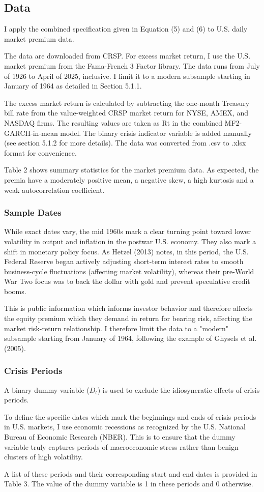 \documentclass[12pt]{article}
\begin{document}
\subsection{Data}
I apply the combined specification given in Equation (5) and (6) to U.S. daily market premium data.\par
The data are downloaded from CRSP. For excess market return, I use the U.S. market premium from the Fama-French 3 Factor library. The data runs from July of 1926 to April of 2025, inclusive. I limit it to a modern subsample starting in January of 1964 as detailed in Section 5.1.1.\par
The excess market return is calculated by subtracting the one-month Treasury bill rate from the value-weighted CRSP market return for NYSE, AMEX, and NASDAQ firms. The resulting values are taken as Rt in the combined MF2-GARCH-in-mean model. The binary crisis indicator variable is added manually (see section 5.1.2 for more details). The data was converted from .csv to .xlsx format for convenience.\par
Table 2 shows summary statistics for the market premium data. As expected, the premia have a moderately positive mean, a negative skew, a high kurtosis and a weak autocorrelation coefficient.
\subsubsection{Sample Dates}
While exact dates vary, the mid 1960s mark a clear turning point toward lower volatility in output and inflation in the postwar U.S. economy. They also mark a shift in monetary policy focus. As Hetzel (2013) notes, in this period, the U.S. Federal Reserve began actively adjusting short-term interest rates to smooth business-cycle fluctuations (affecting market volatility), whereas their pre-World War Two focus was to back the dollar with gold and prevent speculative credit booms.\par
This is public information which informs investor behavior and therefore affects the equity premium which they demand in return for bearing risk, affecting the market risk-return relationship. I therefore limit the data to a "modern" subsample starting from January of 1964, following the example of Ghysels et al. (2005).
\subsubsection{Crisis Periods}
A binary dummy variable ($D_t$) is used to exclude the idiosyncratic effects of crisis periods.\par
To define the specific dates which mark the beginnings and ends of crisis periods in U.S. markets, I use economic recessions as recognized by the U.S. National Bureau of Economic Research (NBER). This is to ensure that the dummy variable truly captures periods of macroeconomic stress rather than benign clusters of high volatility.\par
A list of these periods and their corresponding start and end dates is provided in Table 3. The value of the dummy variable is 1 in these periods and 0 otherwise.
\end{document}
